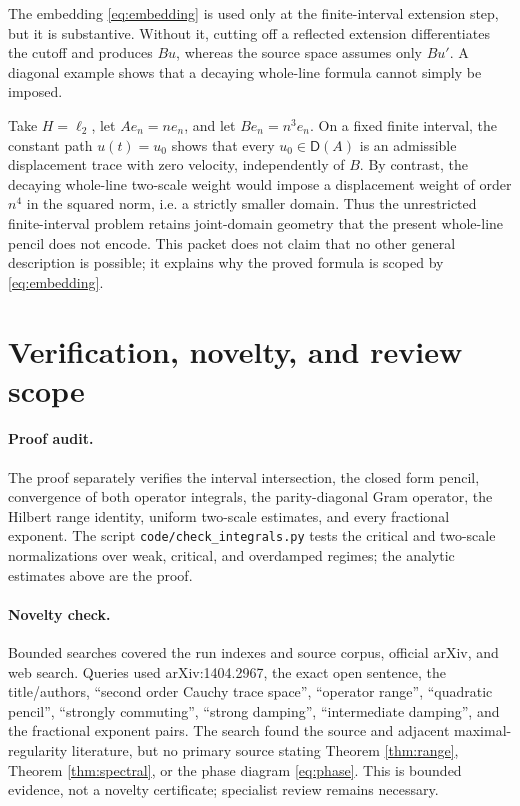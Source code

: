 \documentclass[11pt]{article}
\theoremstyle{remark}
\newcommand{\Dom}{\mathsf D}
\begin{document}
The embedding \eqref{eq:embedding} is used only at the finite-interval
extension step, but it is substantive.  Without it, cutting off a reflected
extension differentiates the cutoff and produces $Bu$, whereas the source
space assumes only $Bu'$.  A diagonal example shows that a decaying
whole-line formula cannot simply be imposed.

Take $H=\ell_2$, let $A e_n=n e_n$, and let $B e_n=n^3 e_n$.  On a fixed
finite interval, the constant path $u(t)=u_0$ shows that every
$u_0\in\Dom(A)$ is an admissible displacement trace with zero velocity,
independently of $B$.  By contrast, the decaying whole-line two-scale weight
would impose a displacement weight of order $n^4$ in the squared norm, i.e.
a strictly smaller domain.  Thus the unrestricted finite-interval problem
retains joint-domain geometry that the present whole-line pencil does not
encode.  This packet does not claim that no other general description is
possible; it explains why the proved formula is scoped by
\eqref{eq:embedding}.

\section{Verification, novelty, and review scope}

\paragraph{Proof audit.}
The proof separately verifies the interval intersection, the closed form
pencil, convergence of both operator integrals, the parity-diagonal Gram
operator, the Hilbert range identity, uniform two-scale estimates, and every
fractional exponent.  The script \texttt{code/check\_integrals.py} tests the
critical and two-scale normalizations over weak, critical, and overdamped
regimes; the analytic estimates above are the proof.

\paragraph{Novelty check.}
Bounded searches covered the run indexes and source corpus, official arXiv,
and web search.  Queries used arXiv:1404.2967, the exact open sentence, the
title/authors, ``second order Cauchy trace space'', ``operator range'',
``quadratic pencil'', ``strongly commuting'', ``strong damping'',
``intermediate damping'', and the fractional exponent pairs.  The search
found the source and adjacent maximal-regularity literature, but no primary
source stating Theorem \ref{thm:range}, Theorem \ref{thm:spectral}, or the
phase diagram \eqref{eq:phase}.  This is bounded evidence, not a novelty
certificate; specialist review remains necessary.
\end{document}
